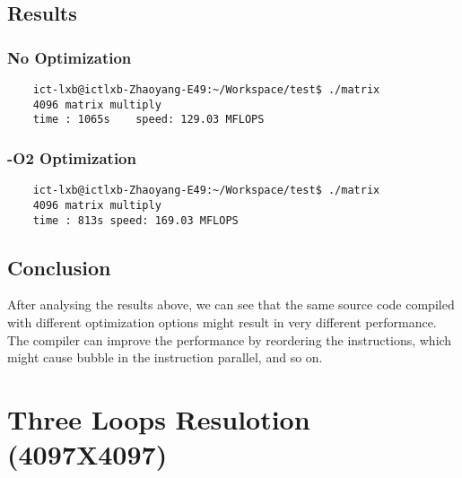 \documentclass[a4paper, 11pt]{article}
\begin{document}
\subsection{Results}

\subsubsection{No Optimization}
\begin{verbatim}
    ict-lxb@ictlxb-Zhaoyang-E49:~/Workspace/test$ ./matrix
    4096 matrix multiply
    time : 1065s    speed: 129.03 MFLOPS
\end{verbatim}

\subsubsection{-O2 Optimization}
\begin{verbatim}
    ict-lxb@ictlxb-Zhaoyang-E49:~/Workspace/test$ ./matrix
    4096 matrix multiply
    time : 813s speed: 169.03 MFLOPS
\end{verbatim}

\subsection{Conclusion}
After analysing the results above, we can see that the same source code
compiled with different optimization options might result in very different
performance. The compiler can improve the performance by reordering the
instructions, which might cause bubble in the instruction parallel, and so
on.

\section{Three Loops Resulotion (4097X4097)}
\end{document}
